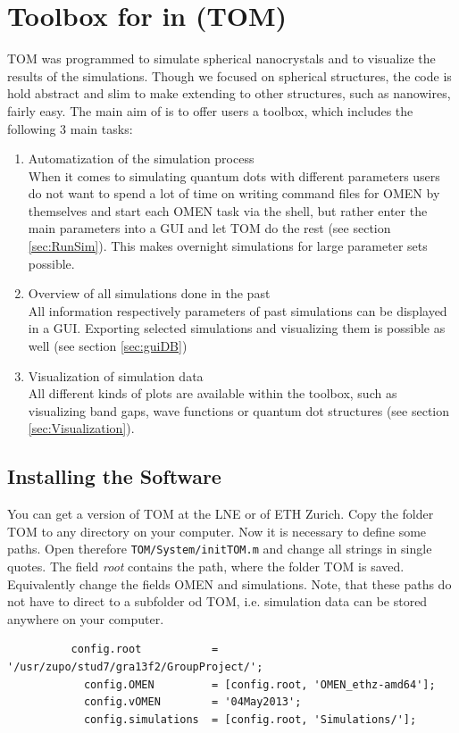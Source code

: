 \chapter{Toolbox for \omen in \matlab (TOM)}

	\gls{TOM} was programmed to simulate spherical nanocrystals and to visualize the results of the simulations.
	Though we focused on spherical structures, the code is hold abstract and slim to make extending to other
	structures, such as nanowires, fairly easy.
	The main aim of \software is to offer \omen users a toolbox, which includes the following 3 main tasks:
	\begin{enumerate}
		\itemsep 0pt
		\item Automatization of the \omen simulation process \\
					When it comes to simulating quantum dots with different parameters users do not want to spend a lot
					of time on writing command files for OMEN by themselves and start each OMEN task via the shell, but 
					rather enter the main parameters into a \gls{GUI} and let \gls{TOM} do the rest (see section \ref{sec:RunSim}).
					This makes overnight simulations for large parameter sets possible.
		\item Overview of all simulations done in the past	\\
					All information respectively parameters of past simulations can be displayed in a \gls{GUI}. Exporting selected
					simulations and visualizing them is possible as well (see section \ref{sec:guiDB})
		\item Visualization of simulation data	\\
					All different kinds of plots are available within the toolbox, such as visualizing band gaps, wave functions or
					quantum dot structures (see section \ref{sec:Visualization}).
	\end{enumerate}

	\section{Installing the Software}
		You can get a version of \gls{TOM} at the \gls{LNE} or of ETH Zurich. Copy the folder TOM to any directory on your computer.
		Now it is necessary to define some paths. Open therefore \lstinline{TOM/System/initTOM.m} and change all strings in single quotes.
		The field {\it root} contains the path, where the folder TOM is saved. Equivalently change the fields OMEN and simulations. Note,
		that these paths do not have to direct to a subfolder od TOM, i.e. simulation data can be stored anywhere on your computer.
		\begin{lstlisting}
		  config.root     		= '/usr/zupo/stud7/gra13f2/GroupProject/'; 
			config.OMEN         = [config.root, 'OMEN_ethz-amd64'];
			config.vOMEN        = '04May2013';
			config.simulations  = [config.root, 'Simulations/'];
		\end{lstlisting}

